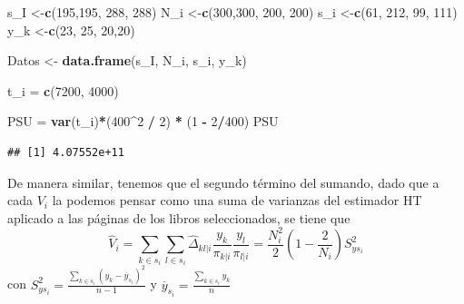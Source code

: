\documentclass[
]{article}
\newenvironment{Shaded}{\begin{snugshade}}{\end{snugshade}}
\newcommand{\DecValTok}[1]{\textcolor[rgb]{0.00,0.00,0.81}{#1}}
\newcommand{\KeywordTok}[1]{\textcolor[rgb]{0.13,0.29,0.53}{\textbf{#1}}}
\newcommand{\NormalTok}[1]{#1}
\newcommand{\OperatorTok}[1]{\textcolor[rgb]{0.81,0.36,0.00}{\textbf{#1}}}
\newcommand{\StringTok}[1]{\textcolor[rgb]{0.31,0.60,0.02}{#1}}
\begin{document}
\begin{Shaded}
\begin{Highlighting}[]
\NormalTok{s_I <-}\KeywordTok{c}\NormalTok{(}\DecValTok{195}\NormalTok{,}\DecValTok{195}\NormalTok{, }\DecValTok{288}\NormalTok{, }\DecValTok{288}\NormalTok{)}
\NormalTok{N_i <-}\KeywordTok{c}\NormalTok{(}\DecValTok{300}\NormalTok{,}\DecValTok{300}\NormalTok{, }\DecValTok{200}\NormalTok{, }\DecValTok{200}\NormalTok{)}
\NormalTok{s_i <-}\KeywordTok{c}\NormalTok{(}\DecValTok{61}\NormalTok{, }\DecValTok{212}\NormalTok{, }\DecValTok{99}\NormalTok{, }\DecValTok{111}\NormalTok{)}
\NormalTok{y_k <-}\KeywordTok{c}\NormalTok{(}\DecValTok{23}\NormalTok{, }\DecValTok{25}\NormalTok{, }\DecValTok{20}\NormalTok{,}\DecValTok{20}\NormalTok{)}

\NormalTok{Datos <-}\StringTok{ }\KeywordTok{data.frame}\NormalTok{(s_I, N_i, s_i, y_k)}

\NormalTok{t_i =}\StringTok{ }\KeywordTok{c}\NormalTok{(}\DecValTok{7200}\NormalTok{, }\DecValTok{4000}\NormalTok{)}
 
\NormalTok{PSU =}\StringTok{ }\KeywordTok{var}\NormalTok{(t_i)}\OperatorTok{*}\NormalTok{(}\DecValTok{400}\OperatorTok{^}\DecValTok{2} \OperatorTok{/}\StringTok{ }\DecValTok{2}\NormalTok{) }\OperatorTok{*}\StringTok{ }\NormalTok{(}\DecValTok{1} \OperatorTok{-}\StringTok{ }\DecValTok{2}\OperatorTok{/}\DecValTok{400}\NormalTok{)}
\NormalTok{PSU}
\end{Highlighting}
\end{Shaded}

\begin{verbatim}
## [1] 4.07552e+11
\end{verbatim}

De manera similar, tenemos que el segundo término del sumando, dado que
a cada \(V_i\) la podemos pensar como una suma de varianzas del
estimador HT aplicado a las páginas de los libros seleccionados, se
tiene que
\[\widehat{V}_i= \sum_{k\in s_i}\sum_{l\in s_i} \widehat{\Delta}_{kl|i}\frac{y_k}{\pi_{k|i}}\frac{y_l}{\pi_{l|i}} = \frac{N_i^2}{2}\left( 1 - \frac{2}{N_i} \right) S^2_{y s_i}\]
con
\(S^2_{y s_i} = \frac{\sum_{k\in s_i}(y_k - \overline{y}_{s_i})^2}{n-1}\)
y \(\overline{y}_{s_i} = \frac{\sum_{k\in s_i}y_k}{n}\)
\end{document}

